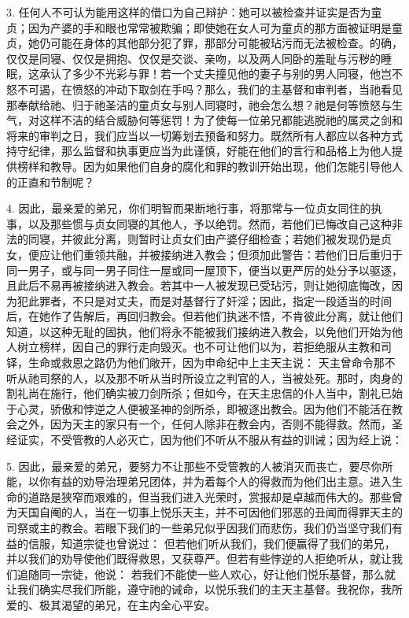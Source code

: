 3. 任何人不可认为能用这样的借口为自己辩护：她可以被检查并证实是否为童贞；因为产婆的手和眼也常常被欺骗；即使她在女人可为童贞的那方面被证明是童贞，她仍可能在身体的其他部分犯了罪，那部分可能被玷污而无法被检查。的确，仅仅是同寝、仅仅是拥抱、仅仅是交谈、亲吻，以及两人同卧的羞耻与污秽的睡眠，这承认了多少不光彩与罪！若一个丈夫撞见他的妻子与别的男人同寝，他岂不怒不可遏，在愤怒的冲动下取剑在手吗？那么，我们的主基督和审判者，当祂看见那奉献给祂、归于祂圣洁的童贞女与别人同寝时，祂会怎么想？祂是何等愤怒与生气，对这样不洁的结合威胁何等惩罚！为了使每一位弟兄都能逃脱祂的属灵之剑和将来的审判之日，我们应当以一切筹划去预备和努力。既然所有人都应以各种方式持守纪律，那么监督和执事更应当为此谨慎，好能在他们的言行和品格上为他人提供榜样和教导。因为如果他们自身的腐化和罪的教训开始出现，他们怎能引导他人的正直和节制呢？\par

4. 因此，最亲爱的弟兄，你们明智而果断地行事，将那常与一位贞女同住的执事，以及那些惯与贞女同寝的其他人，予以绝罚。然而，若他们已悔改自己这种非法的同寝，并彼此分离，则暂时让贞女们由产婆仔细检查；若她们被发现仍是贞女，便应让他们重领共融，并被接纳进入教会；但须加此警告：若他们日后重归于同一男子，或与同一男子同住一屋或同一屋顶下，便当以更严厉的处分予以驱逐，且此后不易再被接纳进入教会。若其中一人被发现已受玷污，则让她彻底悔改，因为犯此罪者，不只是对丈夫，而是对基督行了奸淫；因此，指定一段适当的时间后，在她作了告解后，再回归教会。但若他们执迷不悟，不肯彼此分离，就让他们知道，以这种无耻的固执，他们将永不能被我们接纳进入教会，以免他们开始为他人树立榜样，因自己的罪行走向毁灭。也不可让他们以为，若拒绝服从主教和司铎，生命或救恩之路仍为他们敞开，因为申命纪中上主天主说： 天主曾命令那不听从祂司祭的人，以及那不听从当时所设立之判官的人，当被处死。那时，肉身的割礼尚在施行，他们确实被刀剑所杀；但如今，在天主忠信的仆人当中，割礼已始于心灵，骄傲和悖逆之人便被圣神的剑所杀，即被逐出教会。因为他们不能活在教会之外，因为天主的家只有一个，任何人除非在教会内，否则不能得救。然而，圣经证实，不受管教的人必灭亡，因为他们不听从不服从有益的训诫；因为经上说：\par

5. 因此，最亲爱的弟兄，要努力不让那些不受管教的人被消灭而丧亡，要尽你所能，以你有益的劝导治理弟兄团体，并为着每个人的得救而为他们出主意。进入生命的道路是狭窄而艰难的，但当我们进入光荣时，赏报却是卓越而伟大的。那些曾为天国自阉的人，当在一切事上悦乐天主，并不可因他们邪恶的丑闻而得罪天主的司祭或主的教会。若眼下我们的一些弟兄似乎因我们而悲伤，我们仍当坚守我们有益的信服，知道宗徒也曾说过： 但若他们听从我们，我们便赢得了我们的弟兄，并以我们的劝导使他们既得救恩，又获尊严。但若有些悖逆的人拒绝听从，就让我们追随同一宗徒，他说： 若我们不能使一些人欢心，好让他们悦乐基督，那么就让我们确实尽我们所能，遵守祂的诫命，以悦乐我们的主天主基督。我祝你，我所爱的、极其渴望的弟兄，在主内全心平安。\par

